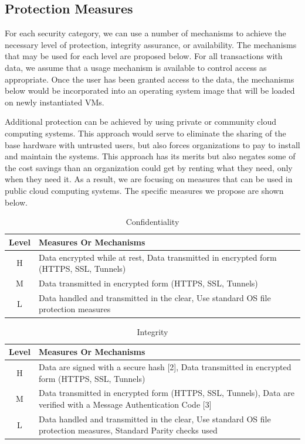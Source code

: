 \documentclass{sig-alternate}
\begin{document}
\subsection{Protection Measures}
For each security category, we can use a number of mechanisms to achieve the necessary level of protection, integrity assurance, or availability.  The mechanisms that may be used for each level are proposed below.  For all transactions with data, we assume that a usage mechanism is available to control access as appropriate.  Once the user has been granted access to the data, the mechanisms below would be incorporated into an operating system image that will be loaded on newly instantiated VMs.

Additional protection can be achieved by using private or community cloud computing systems.  This approach would serve to eliminate the sharing of the base hardware with untrusted users, but also forces organizations to pay to install and maintain the systems.  This approach has its merits but also negates some of the cost savings than an organization could get by renting what they need, only when they need it.  As a result, we are focusing on measures that can be used in public cloud computing systems.  The specific measures we propose are shown below.

\begin{table}[ht]
\begin{tabular}{|c|p{2.5in}|}
\hline
Level &  Measures Or Mechanisms \\
\hline
H & Data encrypted while at rest, 
    Data transmitted in encrypted form (HTTPS, SSL, Tunnels) \\
\hline
M & Data transmitted in encrypted form (HTTPS, SSL, Tunnels) \\
\hline
L & Data handled and transmitted in the clear,
    Use standard OS file protection measures \\
\hline
\end{tabular}
\caption{Confidentiality}
\end{table}

\begin{table}[ht]
\begin{tabular}{|c|p{2.5in}|}
\hline
Level &  Measures Or Mechanisms \\
\hline
H & Data are signed with a secure hash [2],
    Data transmitted in encrypted form (HTTPS, SSL, Tunnels)\\
\hline
M & Data transmitted in encrypted form (HTTPS, SSL, Tunnels),
    Data are verified with a Message Authentication Code [3]\\
\hline
L & Data handled and transmitted in the clear,
    Use standard OS file protection measures, 
    Standard Parity checks used\\
\hline
\end{tabular}
\caption{Integrity}
\end{table}
\end{document}
